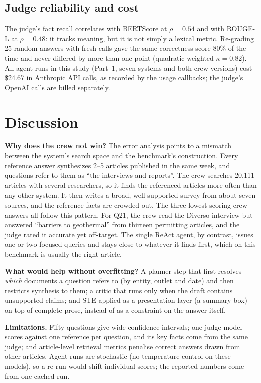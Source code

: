 \documentclass[conference]{IEEEtran}
\begin{document}
\subsection{Judge reliability and cost}
The judge's fact recall correlates with BERTScore at $\rho=0.54$ and with ROUGE-L at $\rho=0.48$: it tracks meaning,
but it is not simply a lexical metric. Re-grading 25 random answers with fresh calls gave the same correctness score
80\% of the time and never differed by more than one point (quadratic-weighted $\kappa=0.82$). All agent runs in this study
(Part~1, seven systems and both crew versions) cost \$24.67 in Anthropic API calls, as recorded by the usage
callbacks; the judge's OpenAI calls are billed separately.

\section{Discussion}
\textbf{Why does the crew not win?} The error analysis points to a mismatch between the system's search space and
the benchmark's construction. Every reference answer synthesizes 2--5 articles published in the same week, and
questions refer to them as ``the interviews and reports''. The crew searches 20{,}111 articles with several
researchers, so it finds the referenced articles more often than any other system. It then writes a broad,
well-supported survey from about seven sources, and the reference facts are crowded out. The three lowest-scoring
crew answers all follow this pattern. For Q21, the crew read the Diverso interview but answered ``barriers to
geothermal'' from thirteen permitting articles, and the judge rated it accurate yet off-target. The single ReAct
agent, by contrast, issues one or two focused queries and stays close to whatever it finds first, which on this
benchmark is usually the right article.

\textbf{What would help without overfitting?} A planner step that first resolves \emph{which} documents a question
refers to (by entity, outlet and date) and then restricts synthesis to them; a critic that runs only when the
draft contains unsupported claims; and STE applied as a presentation layer (a summary box) on top of complete
prose, instead of as a constraint on the answer itself.

\textbf{Limitations.} Fifty questions give wide confidence intervals; one judge model scores against one reference
per question, and its key facts come from the same judge; and article-level retrieval metrics penalise correct
answers drawn from other articles. Agent runs are stochastic (no temperature control on these models), so a
re-run would shift individual scores; the reported numbers come from one cached run.
\end{document}
